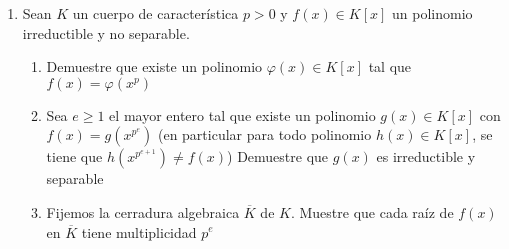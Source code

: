 \documentclass[11pt]{article}
\begin{document}
\begin{enumerate}[label=(\arabic*)]
\begin{proof}
\begin{enumerate}[label=(\alph*)]
                Para la otra parte, nos tomamos cuerpos de la siguiente forma:
                \[K(X^{1/p}+cY^{1/p})\quad c\in K\]
                Notamos que los polinomios minimales de estos cuerpos sobre K, son de a lo más grado $p$, ya que $(X^{1/p}+cY^{1/p})^p=X+c^pY$, pero como $p$ es primo y tienen que dividirlo, o son de grado $1$ o de grado $p$, si son de grado $1$, $K(X^{1/p}+cY^{1/p})=K$, lo cuál claramente es falso. Ahora, tenemos múltiples cuerpos $E$ tal que $K\subset E\subset L$, solo nos falta demostrar que son distintos. Para eso tomamos $c,c'\in K$ distintos tal que $K(X^{1/p}+cY^{1/p})=K(X^{1/p}+c'Y^{1/p})$. Luego
                \[X^{1/p}=\frac{X^{1/p}+cY^{1/p}-c/c'(X^{1/p}+c'Y^{1/p})}{1-c/c'}\]
                Por lo que $K(X^{1/p}+cY^{1/p})=L$, pero eso no puede ser ya que estos son cuerpos intermedios, por lo que todos son distintos. Por esto y porque tenemos una infinidad de $c\in K$ para esto, vemos que hay una infinidad de cuerpos intermedios, por ende la extensión no es simple. 
            \end{enumerate}
        \end{proof}

        \item Sean $K$ un cuerpo de característica $p>0$ y $f(x)\in K[x]$ un polinomio irreductible y no separable.
        \begin{enumerate}[label=(\alph*)]
            \item Demuestre que existe un polinomio $\varphi(x)\in K[x]$ tal que $f(x)=\varphi(x^p)$

            \item Sea $e\geq 1$ el mayor entero tal que existe un polinomio $g(x)\in K[x]$ con $f(x)=g(x^{p^e})$ (en particular para todo polinomio $h(x)\in K[x]$, se tiene que $h(x^{p^{e+1}})\neq f(x)$) Demuestre que $g(x)$ es irreductible y separable

            \item Fijemos la cerradura algebraica $\overline{K}$ de $K$. Muestre que cada raíz de $f(x)$ en $\overline{K}$ tiene multiplicidad $p^e$


\end{enumerate}
\end{enumerate}
\end{document}

